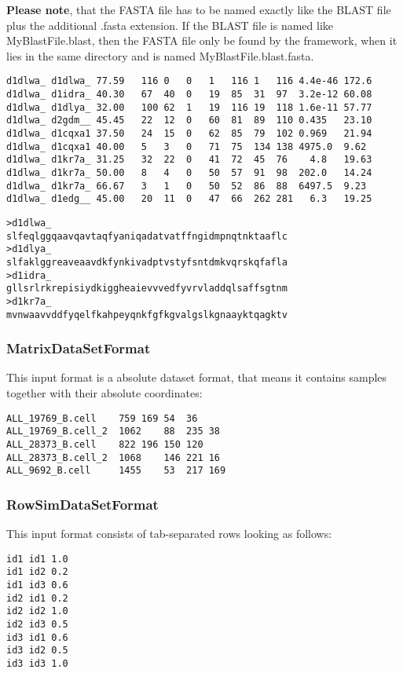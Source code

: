 				\textbf{Please note}, that the FASTA file has to be named exactly like the BLAST file plus the additional .fasta extension. If the BLAST file is named like MyBlastFile.blast, then the FASTA file only be found by the framework, when it lies in the same directory and is named MyBlastFile.blast.fasta.
				
			\begin{lstlisting}
d1dlwa_	d1dlwa_	77.59	116	0	0	1	116	1	116	4.4e-46	172.6
d1dlwa_	d1idra_	40.30	67	40	0	19	85	31	97	3.2e-12	60.08
d1dlwa_	d1dlya_	32.00	100	62	1	19	116	19	118	1.6e-11	57.77
d1dlwa_	d2gdm__	45.45	22	12	0	60	81	89	110	0.435	23.10
d1dlwa_	d1cqxa1	37.50	24	15	0	62	85	79	102	0.969	21.94
d1dlwa_	d1cqxa1	40.00	5	3	0	71	75	134	138	4975.0	9.62
d1dlwa_	d1kr7a_	31.25	32	22	0	41	72	45	76	  4.8	19.63
d1dlwa_	d1kr7a_	50.00	8	4	0	50	57	91	98	202.0	14.24
d1dlwa_	d1kr7a_	66.67	3	1	0	50	52	86	88	6497.5	9.23
d1dlwa_	d1edg__	45.00	20	11	0	47	66	262	281	  6.3	19.25			\end{lstlisting}
				
			\begin{lstlisting}
>d1dlwa_
slfeqlggqaavqavtaqfyaniqadatvatffngidmpnqtnktaaflc
>d1dlya_
slfaklggreaveaavdkfynkivadptvstyfsntdmkvqrskqfafla
>d1idra_
gllsrlrkrepisiydkiggheaievvvedfyvrvladdqlsaffsgtnm
>d1kr7a_
mvnwaavvddfyqelfkahpeyqnkfgfkgvalgslkgnaayktqagktv\end{lstlisting}

			\subsubsection{MatrixDataSetFormat}
			This input format is a absolute dataset format, that means it contains samples together with their absolute coordinates:
			
\begin{lstlisting}
ALL_19769_B.cell	759	169	54	36
ALL_19769_B.cell_2	1062	88	235	38
ALL_28373_B.cell	822	196	150	120
ALL_28373_B.cell_2	1068	146	221	16
ALL_9692_B.cell		1455	53	217	169
\end{lstlisting}
			 

			\subsubsection{RowSimDataSetFormat}
				This input format consists of tab-separated rows looking as follows:
				\begin{lstlisting}
id1	id1	1.0
id1	id2	0.2
id1	id3	0.6
id2	id1	0.2
id2	id2	1.0
id2	id3	0.5
id3	id1	0.6
id3	id2	0.5
id3	id3	1.0				\end{lstlisting}
				
